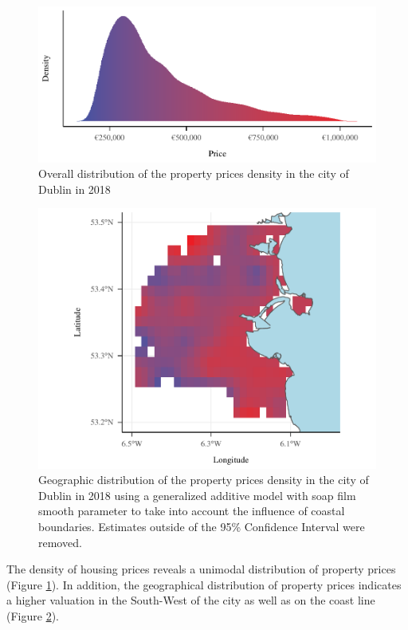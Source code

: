 \documentclass[conference,final,]{IEEEtran}
\begin{document}
\begin{figure}[!h]
\includegraphics[width=0.98\columnwidth]{manuscript_files/figure-latex/distrib-plot-1} \caption{Overall distribution of the property prices density in the city of Dublin in 2018}\label{fig:distrib-plot}
\end{figure}

\begin{figure}[!h]
\includegraphics[width=0.98\columnwidth]{manuscript_files/figure-latex/distrib-gps-1} \caption{Geographic distribution of the property prices density in the city of Dublin in 2018 using a generalized additive model with soap film smooth parameter to take into account the influence of coastal boundaries. Estimates outside of the 95\% Confidence Interval were removed.}\label{fig:distrib-gps}
\end{figure}

The density of housing prices reveals a unimodal distribution of property prices (Figure \ref{fig:distrib-plot}). In addition, the geographical distribution of property prices indicates a higher valuation in the South-West of the city as well as on the coast line (Figure \ref{fig:distrib-gps}).
\end{document}
